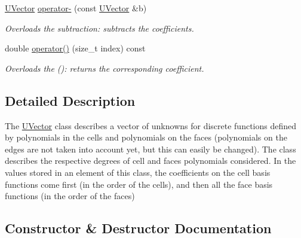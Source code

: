\begin{DoxyCompactItemize}
\mbox{\label{classHArDCore3D_1_1UVector_afacf1951576154d9eb79770ddee87aa0}} 
\hyperlink{classHArDCore3D_1_1UVector}{U\+Vector} \hyperlink{classHArDCore3D_1_1UVector_afacf1951576154d9eb79770ddee87aa0}{operator-\/} (const \hyperlink{classHArDCore3D_1_1UVector}{U\+Vector} \&b)
\begin{DoxyCompactList}\small\item\em Overloads the subtraction\+: subtracts the coefficients. \end{DoxyCompactList}\item 
\mbox{\label{classHArDCore3D_1_1UVector_ac5679636cd20ff654b96a941b742c3fe}} 
double \hyperlink{classHArDCore3D_1_1UVector_ac5679636cd20ff654b96a941b742c3fe}{operator()} (size\+\_\+t index) const
\begin{DoxyCompactList}\small\item\em Overloads the ()\+: returns the corresponding coefficient. \end{DoxyCompactList}\end{DoxyCompactItemize}


\subsection{Detailed Description}
The \hyperlink{classHArDCore3D_1_1UVector}{U\+Vector} class describes a vector of unknowns for discrete functions defined by polynomials in the cells and polynomials on the faces (polynomials on the edges are not taken into account yet, but this can easily be changed). The class describes the respective degrees of cell and faces polynomials considered. In the values stored in an element of this class, the coefficients on the cell basis functions come first (in the order of the cells), and then all the face basis functions (in the order of the faces) 

\subsection{Constructor \& Destructor Documentation}
\mbox{\label{classHArDCore3D_1_1UVector_ae2a9aa60d46161d5cbba31dfd1c5eccd}} 

